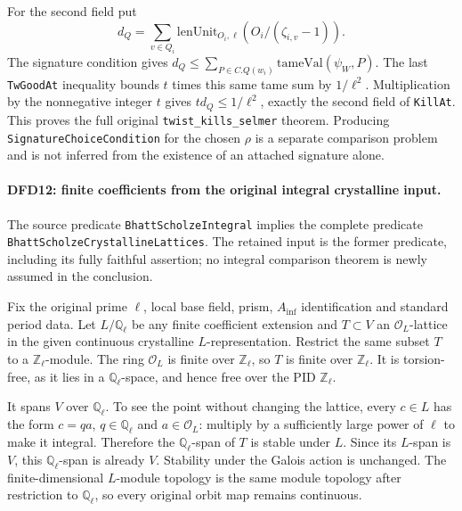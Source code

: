 For the second field put
\[
 d_Q=\sum_{v\in Q_i}
       \mathrm{lenUnit}_{O_i,\ell}
                       (O_i/(\zeta_{i,v}-1)).
\]
The signature condition gives
$d_Q\le\sum_{P\in C.Q(w_i)}\mathrm{tameVal}(\psi_W,P)$.
The last \texttt{Tw\allowbreak Good\allowbreak At} inequality bounds $t$ times
this same tame sum by $1/\ell^2$. Multiplication by the
nonnegative integer $t$ gives $td_Q\le1/\ell^2$, exactly
the second field of \texttt{Kill\allowbreak At}. This proves the full
original \texttt{twist\_\allowbreak kills\_\allowbreak selmer} theorem. Producing
\texttt{Signature\allowbreak Choice\allowbreak Condition} for the chosen $\rho$
is a separate comparison problem and is not inferred from
the existence of an attached signature alone.

\paragraph{DFD12: finite coefficients from the original integral crystalline input.}
\label{claim:DFD12}
The source predicate \texttt{Bhatt\allowbreak Scholze\allowbreak Integral} implies
the complete predicate \texttt{Bhatt\allowbreak Scholze\allowbreak Crystalline\allowbreak Lattices}.
The retained input is the former predicate, including its
fully faithful assertion; no integral comparison theorem
is newly assumed in the conclusion.

Fix the original prime $\ell$, local base field, prism,
$A_{\inf}$ identification and standard period data. Let
$L/\mathbb Q_\ell$ be any finite coefficient extension and
$T\subset V$ an $\mathcal O_L$-lattice in the given
continuous crystalline $L$-representation. Restrict the
same subset $T$ to a $\mathbb Z_\ell$-module. The ring
$\mathcal O_L$ is finite over $\mathbb Z_\ell$, so $T$ is
finite over $\mathbb Z_\ell$. It is torsion-free, as it
lies in a $\mathbb Q_\ell$-space, and hence free over the
PID $\mathbb Z_\ell$.

It spans $V$ over $\mathbb Q_\ell$. To see the point
without changing the lattice, every $c\in L$ has the form
$c=q a$, $q\in\mathbb Q_\ell$ and $a\in\mathcal O_L$:
multiply by a sufficiently large power of $\ell$ to make
it integral. Therefore the $\mathbb Q_\ell$-span of $T$
is stable under $L$. Since its $L$-span is $V$, this
$\mathbb Q_\ell$-span is already $V$. Stability under the
Galois action is unchanged. The finite-dimensional
$L$-module topology is the same module topology after
restriction to $\mathbb Q_\ell$, so every original orbit
map remains continuous.

